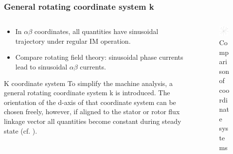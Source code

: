 \begin{frame}
	\frametitle{General rotating coordinate system k}
    \begin{columns}
		\begin{column}{0.55\textwidth}
	       \begin{itemize}
            \item In $\alpha\beta$ coordinates, all quantities have sinusoidal trajectory under regular IM operation.
            \item Compare rotating field theory: sinusoidal phase currents lead to sinusoidal $\alpha\beta$ currents.
           \end{itemize}
           \vspace{-0.4cm}
           \begin{varblock}{K coordinate system}
              To simplify the machine analysis, a general rotating coordinate system k is introduced. The orientation of the d-axis of that coordinate system can be chosen freely, however, if aligned to the stator or rotor flux linkage vector all quantities become constant during steady state (cf.  ).
           \end{varblock}
        \end{column}
        \begin{column}{0.45\textwidth}
            \begin{figure}
                \centering
                \includegraphics[width=0.85\textwidth]{fig/lec06/K_coordinates.pdf}
                \caption{Comparison of coordinate systems}
                \label{fig:K_coordinates}
            \end{figure}
        \end{column}
    \end{columns}
\end{frame}

